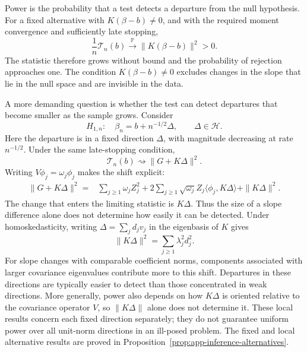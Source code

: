 Power is the probability that a test detects a departure from the null
hypothesis.  For a fixed alternative with $K(\beta-b)\neq0$, and with the
required moment convergence and sufficiently late stopping,
\begin{equation}
    \frac1n\mathcal T_n(b)
    \xrightarrow{\mathbb P}
    \|K(\beta-b)\|^2>0.
    \label{eq:inference-fixed-alternative}
\end{equation}
The statistic therefore grows without bound and the probability of
rejection approaches one.  The condition $K(\beta-b)\neq0$ excludes changes
in the slope that lie in the null space and are invisible in the data.

A more demanding question is whether the test can detect departures that
become smaller as the sample grows.  Consider
\begin{equation}
    H_{1,n}:\quad
    \beta_n=b+n^{-1/2}\Delta,
    \qquad \Delta\in\mathcal H.
    \label{eq:inference-local-alternative}
\end{equation}
Here the departure is in a fixed direction $\Delta$, with magnitude
decreasing at rate $n^{-1/2}$.  Under the same late-stopping condition,
\begin{equation}
    \mathcal T_n(b)
    \rightsquigarrow
    \|G+K\Delta\|^2.
    \label{eq:inference-local-limit}
\end{equation}
Writing $V\phi_j=\omega_j\phi_j$ makes the shift explicit:
\begin{align}
    \|G+K\Delta\|^2
    ={}&\sum_{j\geq1}\omega_jZ_j^2
       +2\sum_{j\geq1}\sqrt{\omega_j}Z_j
          \langle\phi_j,K\Delta\rangle
       +\|K\Delta\|^2.
    \label{eq:inference-local-expansion}
\end{align}
The change that enters the limiting statistic is $K\Delta$.  Thus the size
of a slope difference alone does not determine how easily it can be
detected.  Under homoskedasticity, writing $\Delta=\sum_j d_jv_j$ in the
eigenbasis of $K$ gives
\begin{equation}
    \|K\Delta\|^2
    =\sum_{j\geq1}\lambda_j^2d_j^2.
    \label{eq:inference-detectability}
\end{equation}
For slope changes with comparable coefficient norms, components associated
with larger covariance eigenvalues contribute more to this shift.
Departures in these directions are typically easier to detect than those
concentrated in weak directions.  More generally, power also depends on how
$K\Delta$ is oriented relative to the covariance operator $V$, so
$\|K\Delta\|$ alone does not determine it.  These local results concern
each fixed direction separately; they do not guarantee uniform power over
all unit-norm directions in an ill-posed problem.  The fixed and local
alternative results are proved in
Proposition~\ref{prop:app-inference-alternatives}.

